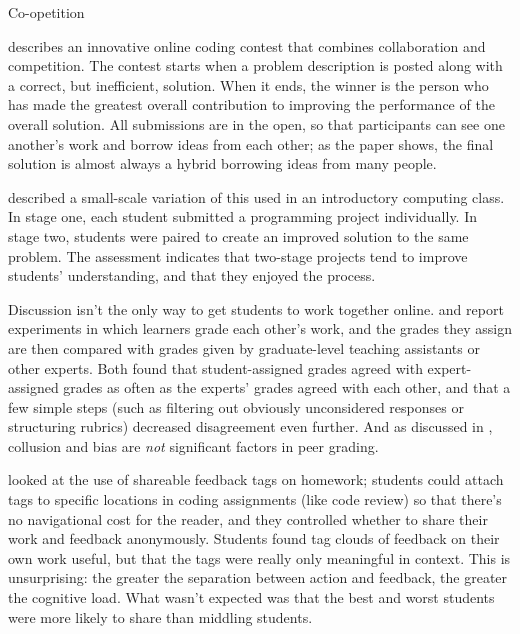 \begin{callout}{Co-opetition}

  \cite{Gull2004} describes an innovative online coding contest that
  combines collaboration and competition.  The contest starts when a
  problem description is posted along with a correct, but inefficient,
  solution.  When it ends, the winner is the person who has made the
  greatest overall contribution to improving the performance of the
  overall solution. All submissions are in the open, so that
  participants can see one another's work and borrow ideas from each
  other; as the paper shows, the final solution is almost always a
  hybrid borrowing ideas from many people.

  \cite{Batt2018} described a small-scale variation of this used in an
  introductory computing class.  In stage one, each student submitted
  a programming project individually.  In stage two, students were
  paired to create an improved solution to the same problem.  The
  assessment indicates that two-stage projects tend to improve
  students' understanding, and that they enjoyed the process.

\end{callout}

Discussion isn't the only way to get students to work together online.
\cite{Pare2008} and \cite{Kulk2013} report experiments in which
learners grade each other's work, and the grades they assign are then
compared with grades given by graduate-level teaching assistants or
other experts. Both found that student-assigned grades agreed with
expert-assigned grades as often as the experts' grades agreed with
each other, and that a few simple steps (such as filtering out
obviously unconsidered responses or structuring rubrics) decreased
disagreement even further.  And as discussed in
, collusion and bias are \emph{not}
significant factors in peer grading.

\cite{Cumm2011} looked at the use of shareable feedback tags on
homework; students could attach tags to specific locations in coding
assignments (like code review) so that there's no navigational cost
for the reader, and they controlled whether to share their work and
feedback anonymously.  Students found tag clouds of feedback on their
own work useful, but that the tags were really only meaningful in
context.  This is unsurprising: the greater the separation between
action and feedback, the greater the cognitive load.  What wasn't
expected was that the best and worst students were more likely to
share than middling students.

